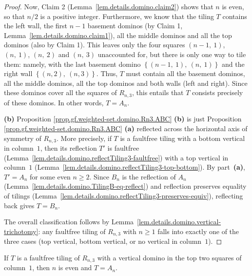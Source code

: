 \begin{proof}
Now, Claim 2 (Lemma~\ref{lem.details.domino.claim2}) shows that $n$ is even, so that $n/2$ is a positive integer.
Furthermore, we know that the tiling $T$ contains the left wall, the first
$n-1$ basement dominos
(by Claim 1, Lemma~\ref{lem.details.domino.claim1}), all the middle dominos
and all the top dominos
(also by Claim 1). This leaves only the four squares $\left(  n-1,\ 1\right)
$, $\left(  n,\ 1\right)  $, $\left(  n,\ 2\right)  $ and $\left(
n,\ 3\right)  $ unaccounted for, but there is only one way to tile them:
namely, with the last basement domino $\left\{  \left(  n-1,\ 1\right)
,\ \left(  n,\ 1\right)  \right\}  $ and the right wall $\left\{  \left(
n,2\right)  ,\ \left(  n,3\right)  \right\}  $. Thus, $T$ must contain all the
basement dominos, all the middle dominos, all the top dominos and both walls
(left and right). Since these dominos cover all the squares of $R_{n,3}$, this
entails that $T$ consists precisely of these dominos. In other words,
$T=A_{n}$. \medskip

\textbf{(b)} Proposition \ref{prop.gf.weighted-set.domino.Rn3.ABC}
\textbf{(b)} is just Proposition \ref{prop.gf.weighted-set.domino.Rn3.ABC}
\textbf{(a)} reflected across the horizontal axis of symmetry of $R_{n,3}$.
More precisely, if $T$ is a faultfree tiling with a bottom vertical in
column~$1$, then its reflection $T'$ is faultfree
(Lemma~\ref{lem.details.domino.reflectTiling3-faultfree}) with a top vertical
in column~$1$ (Lemma~\ref{lem.details.domino.reflectTiling3-top-bottom}).
By part~\textbf{(a)}, $T' = A_n$ for some even $n \ge 2$.
Since $B_n$ is the reflection of $A_n$
(Lemma~\ref{lem.details.domino.TilingB-eq-reflect}) and reflection preserves
equality of tilings
(Lemma~\ref{lem.details.domino.reflectTiling3-preserves-equiv}),
reflecting back gives $T = B_n$.

The overall classification follows by
Lemma~\ref{lem.details.domino.vertical-trichotomy}: any faultfree tiling
of $R_{n,3}$ with $n \ge 1$ falls into exactly one of the three cases
(top vertical, bottom vertical, or no vertical in column~$1$).
\end{proof}

\begin{lemma}
\label{lem.details.domino.classification-part-a}
\leanhelper
\leanok
If $T$ is a faultfree tiling of $R_{n,3}$ with a vertical domino in the top
two squares of column~$1$, then $n$ is even and $T = A_n$.
\end{lemma}

